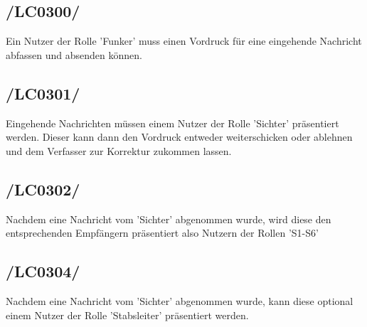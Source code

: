\subsection{/LC0300/}
Ein Nutzer der Rolle 'Funker' muss einen Vordruck für eine eingehende Nachricht abfassen und absenden können.

\subsection{/LC0301/}
Eingehende Nachrichten müssen einem Nutzer der Rolle 'Sichter' präsentiert werden. Dieser kann dann den Vordruck entweder weiterschicken oder ablehnen und dem Verfasser zur Korrektur zukommen lassen.

\subsection{/LC0302/}
Nachdem eine Nachricht vom 'Sichter' abgenommen wurde, wird diese den entsprechenden Empfängern präsentiert also Nutzern der Rollen 'S1-S6'

\subsection{/LC0304/}
Nachdem eine Nachricht vom 'Sichter' abgenommen wurde, kann diese optional einem Nutzer der Rolle 'Stabsleiter' präsentiert werden.